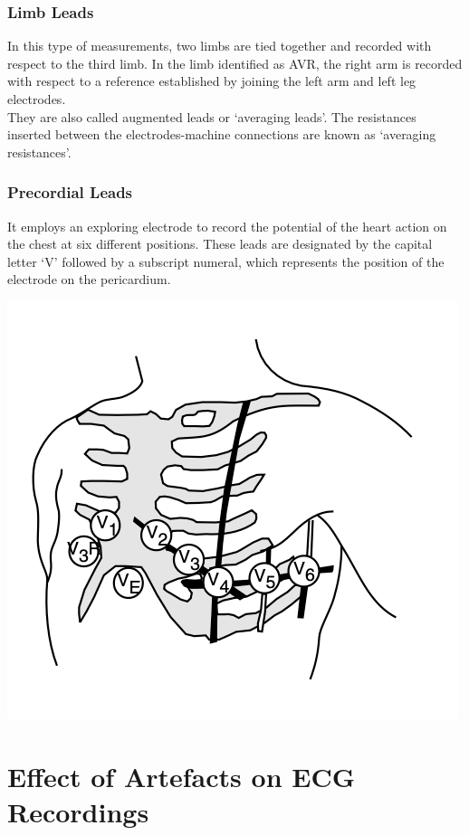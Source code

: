 \documentclass{article}
\begin{document}
\subsubsection{Limb Leads}
In this type of measurements, two limbs are tied together and recorded with respect to the third limb. In the limb identified as AVR, the right arm is recorded with respect to a reference established by joining the left arm and left leg electrodes.\\
They are also called augmented leads or ‘averaging leads’. The resistances inserted between the electrodes-machine connections are known as ‘averaging resistances’.
\subsubsection{Precordial Leads}
It employs an exploring electrode to record the potential of the heart action on the chest at six different positions. These leads are designated by the capital letter ‘V’ followed by a subscript numeral, which represents the position of the electrode on the pericardium. 
\begin{center}
    \includegraphics[scale=0.4]{Screenshot 2023-05-03 at 1.24.33 PM.png}
\end{center}
\section{Effect of Artefacts on ECG Recordings}
\end{document}
